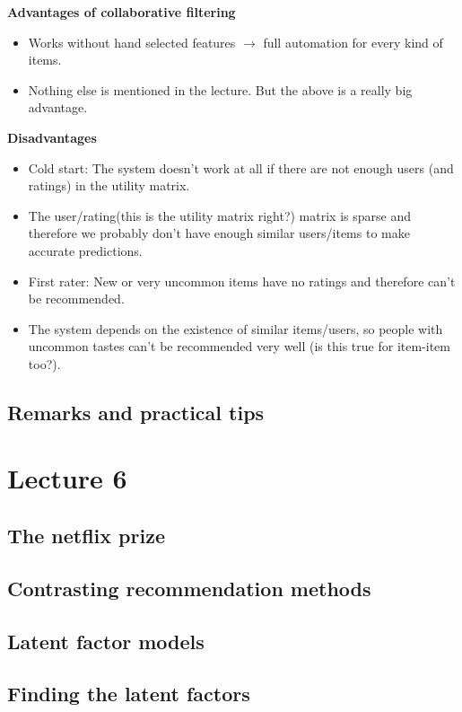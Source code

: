 \documentclass[]{article}
\begin{document}
\textbf{Advantages of collaborative filtering}
\begin{itemize}
\item Works without hand selected features $\rightarrow$ full automation for every kind of items.
\item Nothing else is mentioned in the lecture. But the above is a really big advantage.
\end{itemize}
\textbf{Disadvantages}
\begin{itemize}
\item Cold start: The system doesn't work at all if there are not enough users (and ratings) in the utility matrix.
\item The user/rating(this is the utility matrix right?) matrix is sparse and therefore we probably don't have enough similar users/items to make accurate predictions.
\item First rater: New or very uncommon items have no ratings and therefore can't be recommended.
\item The system depends on the existence of similar items/users, so people with uncommon tastes can't be recommended very well (is this true for item-item too?).
\end{itemize}
\subsection{Remarks and practical tips}


\section{Lecture 6}

\subsection{The netflix prize}

\subsection{Contrasting recommendation methods}

\subsection{Latent factor models}

\subsection{Finding the latent factors}
\end{document}
